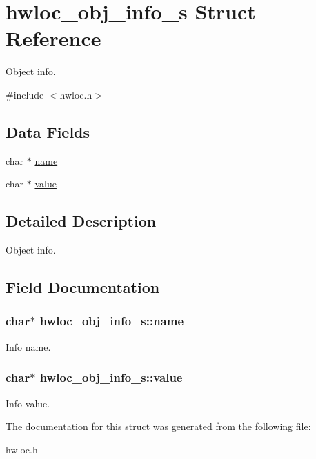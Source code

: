 \hypertarget{a00018}{
\section{hwloc\_\-obj\_\-info\_\-s Struct Reference}
\label{a00018}
}


Object info.  




{\ttfamily \#include $<$hwloc.h$>$}

\subsection*{Data Fields}
\begin{DoxyCompactItemize}
\item 
char $\ast$ \hyperlink{a00018_a115dde58f40338a2d3276d59c099857d}{name}
\item 
char $\ast$ \hyperlink{a00018_a522efd7f5262a4493a73fa3476a041ce}{value}
\end{DoxyCompactItemize}


\subsection{Detailed Description}
Object info. 

\subsection{Field Documentation}
\hypertarget{a00018_a115dde58f40338a2d3276d59c099857d}{
\subsubsection[{name}]{\setlength{\rightskip}{0pt plus 5cm}char$\ast$ {\bf hwloc\_\-obj\_\-info\_\-s::name}}}
\label{a00018_a115dde58f40338a2d3276d59c099857d}


Info name. 

\hypertarget{a00018_a522efd7f5262a4493a73fa3476a041ce}{
\subsubsection[{value}]{\setlength{\rightskip}{0pt plus 5cm}char$\ast$ {\bf hwloc\_\-obj\_\-info\_\-s::value}}}
\label{a00018_a522efd7f5262a4493a73fa3476a041ce}


Info value. 



The documentation for this struct was generated from the following file:\begin{DoxyCompactItemize}
\item 
hwloc.h\end{DoxyCompactItemize}
